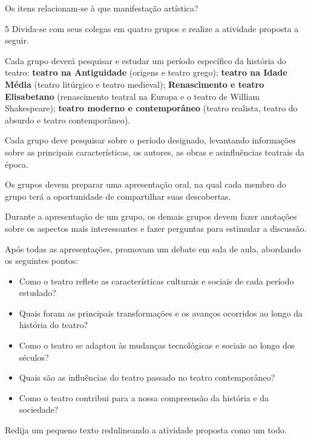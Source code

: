 Os itens relacionam-se à que manifestação artística?


\num{5} Divida-se com seus colegas em quatro grupos e realize a atividade proposta a seguir.

\begin{escolha}
  \item Cada grupo deverá pesquisar e estudar um período específico da história do teatro: \textbf{teatro na Antiguidade} (origens e teatro grego); \textbf{teatro na Idade Média} (teatro litúrgico e teatro medieval); \textbf{Renascimento e teatro Elisabetano} (renascimento teatral na Europa e o teatro de William Shakespeare); \textbf{teatro moderno e contemporâneo} (teatro realista, teatro do absurdo e teatro contemporâneo).
  \item Cada grupo deve pesquisar sobre o período designado, levantando informações sobre as principais características, os autores, as obras e asinfluências teatrais da época.
  \item Os grupos devem preparar uma apresentação oral, na qual cada membro do grupo terá a oportunidade de compartilhar suas descobertas.
  \item Durante a apresentação de um grupo, os demais grupos devem fazer anotações sobre os aspectos mais interessantes e fazer perguntas para estimular a discussão.
\end{escolha}

Após todas as apresentações, promovam um debate em sala de aula, abordando os seguintes pontos:

\begin{itemize}
  \item Como o teatro reflete as características culturais e sociais de cada período estudado?
  \item Quais foram as principais transformações e os avanços ocorridos ao longo da história do teatro?
  \item Como o teatro se adaptou às mudanças tecnológicas e sociais ao longo dos séculos?
  \item Quais são as influências do teatro passado no teatro contemporâneo?
  \item Como o teatro contribui para a nossa compreensão da história e da sociedade?
\end{itemize}

Redija um pequeno texto redulineando a atividade proposta como um todo.

